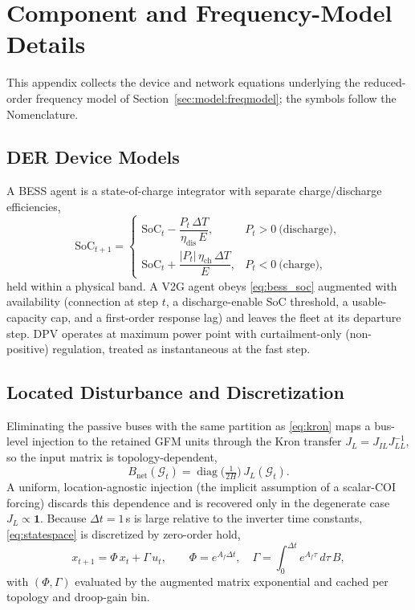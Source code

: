 \documentclass[lettersize,journal]{IEEEtran}
\begin{document}
\appendices
\section{Component and Frequency-Model Details}
\label{app:models}
This appendix collects the device and network equations underlying the reduced-order frequency model of Section~\ref{sec:model:freqmodel}; the symbols follow the Nomenclature.

\subsection{DER Device Models}
A BESS agent is a state-of-charge integrator with separate charge/discharge efficiencies,
\begin{equation}
  \mathrm{SoC}_{t+1}=
  \begin{cases}
    \mathrm{SoC}_t-\dfrac{P_t\,\Delta T}{\eta_{\mathrm{dis}}\,E},
      & P_t>0\ \text{(discharge)},\\[8pt]
    \mathrm{SoC}_t+\dfrac{|P_t|\,\eta_{\mathrm{ch}}\,\Delta T}{E},
      & P_t<0\ \text{(charge)},
  \end{cases}
  \label{eq:bess_soc}
\end{equation}
held within a physical band. A V2G agent obeys \eqref{eq:bess_soc} augmented with availability (connection at step $t$, a discharge-enable SoC threshold, a usable-capacity cap, and a first-order response lag) and leaves the fleet at its departure step. DPV operates at maximum power point with curtailment-only (non-positive) regulation, treated as instantaneous at the fast step.

\subsection{Located Disturbance and Discretization}
Eliminating the passive buses with the same partition as \eqref{eq:kron} maps a bus-level injection to the retained GFM units through the Kron transfer $J_L=J_{IL}J_{LL}^{-1}$, so the input matrix is topology-dependent,
\begin{equation}
  B_{\mathrm{net}}(\mathcal{G}_t)=\operatorname{diag}\!\big(\tfrac{1}{2H}\big)\,J_L(\mathcal{G}_t).
  \label{eq:bnet}
\end{equation}
A uniform, location-agnostic injection (the implicit assumption of a scalar-COI forcing) discards this dependence and is recovered only in the degenerate case $J_L\!\propto\!\mathbf{1}$. Because $\Delta t=1$\,s is large relative to the inverter time constants, \eqref{eq:statespace} is discretized by zero-order hold,
\begin{equation}
  x_{t+1}=\Phi\,x_t+\Gamma\,u_t,\qquad
  \Phi=e^{A_f\Delta t},\quad
  \Gamma=\!\int_0^{\Delta t}\! e^{A_f\tau}\,d\tau\,B,
  \label{eq:zoh}
\end{equation}
with $(\Phi,\Gamma)$ evaluated by the augmented matrix exponential and cached per topology and droop-gain bin.
\end{document}
